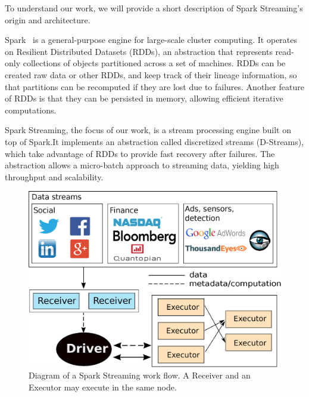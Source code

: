 %
To understand our work, we will provide a short description of Spark Streaming's origin and architecture.

Spark~\cite{Spark} is a general-purpose engine for large-scale cluster computing. It operates on Resilient Distributed Datasets (RDDs), an abstraction that represents read-only collections of objects partitioned across a set of machines. RDDs can be created raw data or other RDDs, and keep track of their lineage information, so that partitions can be recomputed if they are lost due to failures. Another feature of RDDs is that they can be persisted in memory, allowing efficient iterative computations.

Spark Streaming, the focus of our work, is a stream processing engine built on top of Spark.It implements an abstraction called discretized streams (D-Streams), which take advantage of RDDs to provide fast recovery after failures. The abstraction allows a micro-batch approach to streaming data, yielding high throughput and scalability.

\begin{figure}[t!]
  \begin{center}
    \includegraphics[scale=0.35]{images_graphs/spark_architecture_v4.eps}
  \end{center}
  \caption{Diagram of a Spark Streaming work flow. A Receiver and an Executor may execute in the same node.}
  \label{fig:SparkStreaming_architecture}
\end{figure}

